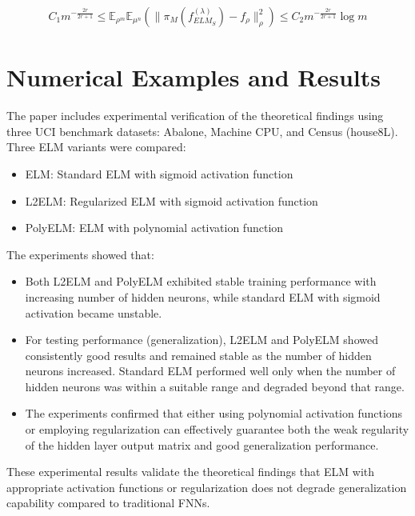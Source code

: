 \documentclass[11pt]{article}
\begin{document}
\begin{align}
C_1 m^{-\frac{2r}{2r+1}} \leq \mathbb{E}_{\rho^m}\mathbb{E}_{\mu^n} \left( \|\pi_M(f_{ELM_S}^{(\lambda)}) - f_\rho\|_\rho^2 \right) \leq C_2 m^{-\frac{2r}{2r+1}} \log m
\end{align}

\section{Numerical Examples and Results}

The paper includes experimental verification of the theoretical findings using three UCI benchmark datasets: Abalone, Machine CPU, and Census (house8L). Three ELM variants were compared:

\begin{itemize}
    \item ELM: Standard ELM with sigmoid activation function
    \item L2ELM: Regularized ELM with sigmoid activation function
    \item PolyELM: ELM with polynomial activation function
\end{itemize}

The experiments showed that:

\begin{itemize}
    \item Both L2ELM and PolyELM exhibited stable training performance with increasing number of hidden neurons, while standard ELM with sigmoid activation became unstable.
    
    \item For testing performance (generalization), L2ELM and PolyELM showed consistently good results and remained stable as the number of hidden neurons increased. Standard ELM performed well only when the number of hidden neurons was within a suitable range and degraded beyond that range.
    
    \item The experiments confirmed that either using polynomial activation functions or employing regularization can effectively guarantee both the weak regularity of the hidden layer output matrix and good generalization performance.
\end{itemize}

These experimental results validate the theoretical findings that ELM with appropriate activation functions or regularization does not degrade generalization capability compared to traditional FNNs.
\end{document}

